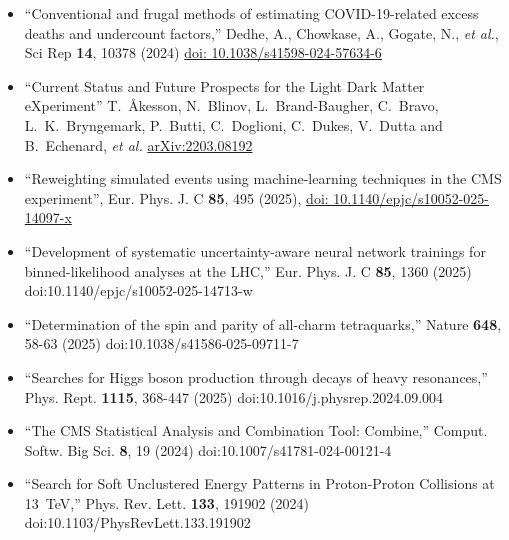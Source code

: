 \begin{flushleft}
{\fontsize{10pt}{1em}\bodyfontlight\upshape\color{black}
\begin{itemize}
\item ``Conventional and frugal methods of estimating COVID-19-related excess deaths and undercount factors,'' Dedhe, A., Chowkase, A., Gogate, N., \textit{et al.},
Sci Rep \textbf{14}, 10378 (2024)
\href{https://doi.org/10.1038/s41598-024-57634-6}{doi: 10.1038/s41598-024-57634-6}
\item ``Current Status and Future Prospects for the Light Dark Matter eXperiment''  T.~\r{A}kesson, N.~Blinov, L.~Brand-Baugher, C.~Bravo, L.~K.~Bryngemark, P.~Butti, C.~Doglioni, C.~Dukes, V.~Dutta and B.~Echenard, \textit{et al.}
\href{http://arxiv.org/abs/2203.08192}{arXiv:2203.08192}
\end{itemize}


\begin{itemize}
\item ``Reweighting simulated events using machine-learning techniques in the CMS experiment'', Eur. Phys. J. C \textbf{85}, 495 (2025),
\href{https://doi.org/10.1140/epjc/s10052-025-14097-x}{doi: 10.1140/epjc/s10052-025-14097-x}
\item ``Development of systematic uncertainty-aware neural network trainings for binned-likelihood analyses at the LHC,'' Eur. Phys. J. C \textbf{85}, 1360 (2025) doi:10.1140/epjc/s10052-025-14713-w
\item ``Determination of the spin and parity of all-charm tetraquarks,''
Nature \textbf{648}, 58-63 (2025)
doi:10.1038/s41586-025-09711-7
\item ``Searches for Higgs boson production through decays of heavy resonances,''
Phys. Rept. \textbf{1115}, 368-447 (2025)
doi:10.1016/j.physrep.2024.09.004
\item ``The CMS Statistical Analysis and Combination Tool: Combine,''
Comput. Softw. Big Sci. \textbf{8}, 19 (2024)
doi:10.1007/s41781-024-00121-4
\item ``Search for Soft Unclustered Energy Patterns in Proton-Proton Collisions at 13~TeV,''
Phys. Rev. Lett. \textbf{133}, 191902 (2024)
doi:10.1103/PhysRevLett.133.191902
\end{itemize}

}
\end{flushleft}




